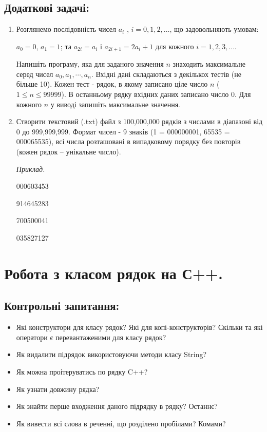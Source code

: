 \documentclass[a5paper,titlepage,openany,twoside,draft]{book_unv}%
\begin{document}
\section{Додаткові задачі:}
\begin{enumerate}
\def\labelenumi{\arabic{enumi})}
\setcounter{enumi}{33}

\item  Розглянемо послідовність чисел \(a_{i}\) , $i = 0, 1, 2, \ldots$, що
задовольняють умовам:

\(a_{0} = 0\), \(a_{1} = 1\); та \(a_{2i} = a_{i}\) і
\(a_{2i + 1} = {2a}_{i} + 1\) для кожного $i = 1, 2, 3, \ldots{} $.

Напишіть програму, яка для заданого значення $n$ знаходить максимальне
серед чисел \(a_{0},a_{1},\cdots,a_{n}\). Вхідні дані складаються з
декількох тестів (не більше 10). Кожен тест - рядок, в якому записано
ціле число $n$ ($1 \le n \le 99 999$). В останньому рядку вхідних даних записано
число 0. Для кожного $n$ у виводі запишіть максимальне значення.

\item
Створити текстовий (.txt) файл з 100,000,000 рядків з числами
в діапазоні від 0 до 999,999,999. Формат чисел - 9 знаків 
(1 = 000000001, 65535 = 000065535), всі числа розташовані в випадковому порядку без
повторів (кожен рядок -- унікальне число).

\emph{Приклад.}

000603453
 
914645283 

700500041 

035827127 
\end{enumerate}


\chapter{Робота з класом рядок на С++.}
%

\section{Контрольні запитання:}
\begin{itemize}
\item
  Які конструктори для класу рядок? Які для копі-конструкторів? Скільки та
  які оператори є перевантаженими для класу рядок?
\item
  Як видалити підрядок використовуючи методи класу String?
\item
  Як можна проітеруватись по рядку C++?
\item
  Як узнати довжину рядка?
\item
  Як знайти перше входження даного підрядку в рядку? Останнє?
\item
  Як вивести всі слова в реченні, що розділено пробілами? Комами?
\end{itemize}
\end{document}
